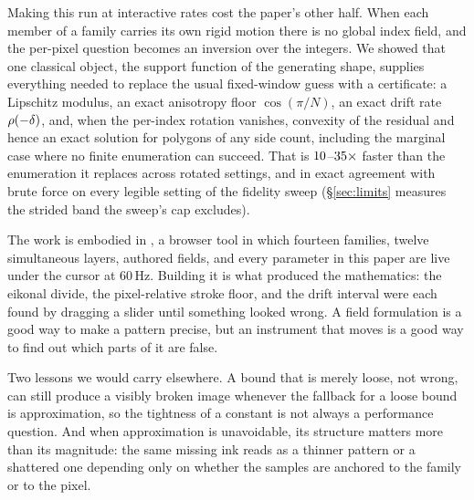 Making this run at interactive rates cost the paper's other half. When each member
of a family carries its own rigid motion there is no global index field, and the
per-pixel question becomes an inversion over the integers. We showed that one
classical object, the support function of the generating shape, supplies
everything needed to replace the usual fixed-window guess with a certificate: a
Lipschitz modulus, an exact anisotropy floor $\cos(\pi/N)$, an exact drift rate
$\rho(-\delta)$, and, when the per-index rotation vanishes, convexity of the
residual and hence an exact solution for polygons of any side count, including the
marginal case where no finite enumeration can succeed. That is
$10$--$35\times$ faster than the enumeration it replaces
across rotated settings, and in exact agreement with brute force on every
legible setting of the fidelity sweep (\S\ref{sec:limits} measures the strided
band the sweep's cap excludes).

The work is embodied in \Moire{}, a browser tool in which fourteen families,
twelve simultaneous layers, authored fields, and every parameter in this paper
are live under the cursor at $60$\,Hz. Building it is what produced the
mathematics: the eikonal divide, the pixel-relative stroke floor, and the drift
interval were each found by dragging a slider until something looked wrong. A
field formulation is a good way to make a pattern precise, but an instrument
that moves is a good way to find out which parts of it are false.

Two lessons we would carry elsewhere. A bound that is merely loose, not wrong, can
still produce a visibly broken image whenever the fallback for a loose bound is
approximation, so the tightness of a constant is not always a performance
question. And when approximation is unavoidable, its structure matters more than
its magnitude: the same missing ink reads as a thinner pattern or a shattered one
depending only on whether the samples are anchored to the family or to the pixel.

